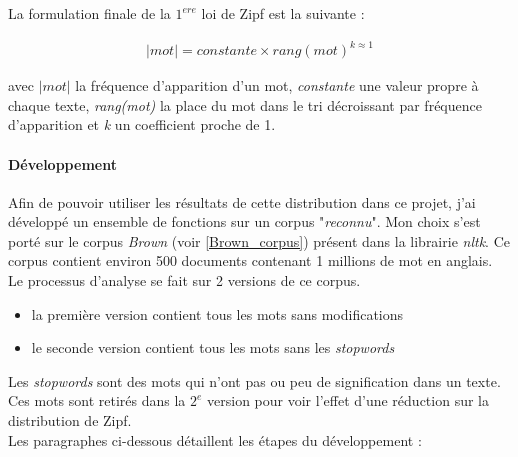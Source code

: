\documentclass[a4paper,12pt]{article}
\begin{document}
		La formulation finale de la $1^{ere}$ loi de Zipf est la suivante :
		
		\begin{align*}
				|mot| = constante \times rang(mot)^{k \approx 1}
		\end{align*}
		
		avec \emph{$|mot|$} la fréquence d'apparition d'un mot, \emph{constante} une valeur propre à chaque texte, \emph{rang(mot)} la place du mot dans le tri décroissant par fréquence d'apparition et \emph{k} un coefficient proche de 1. 
		
	\paragraph{Développement}
		Afin de pouvoir utiliser les résultats de cette distribution dans ce projet, j'ai développé un ensemble de fonctions sur un corpus "\emph{reconnu}". Mon choix s'est porté sur le corpus \emph{Brown} (voir \ref{Brown_corpus}) présent dans la librairie \emph{nltk}. Ce corpus contient environ 500 documents contenant 1 millions de mot en anglais.\\
		
		Le processus d'analyse se fait sur 2 versions de ce corpus.
		\begin{itemize}
			\item la première version contient tous les mots sans modifications
			\item le seconde version contient tous les mots sans les \emph{stopwords}
		\end{itemize}
		Les \emph{stopwords} sont des mots qui n'ont pas ou peu de signification dans un texte. Ces mots sont retirés dans la $2^e$ version pour voir l'effet d'une réduction sur la distribution de Zipf. \\
		
		Les paragraphes ci-dessous détaillent les étapes du développement :
		
\end{document}
